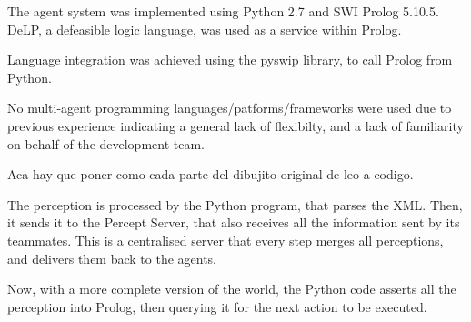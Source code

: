 \documentclass{llncs2e/llncs}
\begin{document}
\begin{comment}

PREGUNTAS {
1. Which programming language did you use to implement the multi-agent system?
2. Did you use multi-agent programming languages? Why or why not to use a 
multi-agent programming language?
3. How have you mapped the designed architecture (both multi-agent and 
individual agent architectures) to programming codes i.e., how did you 
implement specific agent-oriented concepts and designed artifacts using the 
programming language?
4. Which development platforms and tools are used? How much time did you 
invest in learning those?
5. Which runtime platforms and tools (e.g. Jade, AgentScape, simply Java, 
....) are used? How much time did you invest in learning those?
6. What features were missing in your language choice that would have 
facilitated your development task?
7. What features of your programming language has simplified your development 
task?
8. Which algorithms are used/implemented?
9. How did you distribute the agents on several machines? And if you did not 
please justify why.
10. To which extend is the reasoning of your agents synchronized with the 
receive-percepts/send-action cycle?
11. What part of the development was most difficult/complex? What kind of 
problems have you found and how are they solved?
12. How many lines of code did you write for your software?
}

\end{comment}

    The agent system was implemented using Python 2.7 and SWI Prolog 5.10.5. DeLP, 
    a defeasible logic language, was used as a service within Prolog.

    Language integration was achieved using the pyswip library, to call Prolog 
    from Python.

    No multi-agent programming languages/patforms/frameworks were used due to 
    previous experience indicating a general lack of flexibilty, and a lack of 
    familiarity on behalf of the development team.

    Aca hay que poner como cada parte del dibujito original de leo a codigo.

    The perception is processed by the Python program, that parses the XML. Then, 
    it sends it to the Percept Server, that also receives all the information sent 
    by its teammates. This is a centralised server that every step merges all 
    perceptions, and delivers them back to the agents.

    Now, with a more complete version of the world, the Python code asserts all 
    the perception into Prolog, then querying it for the next action to be 
    executed. 
\end{document}

